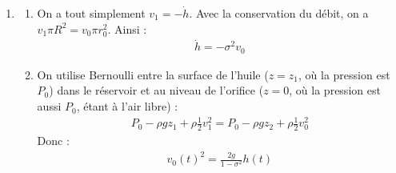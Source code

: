 \begin{correction}
\begin{enumerate}
\begin{enumerate}
	En utilisant l'expression de la divergence, on a:
	\begin{align*}
		\frac{1}{r}\frac{\partial(rv_r)}{\partial r}=-\frac{g}{\sqrt{v_0^2+2gz}}
	\end{align*}
	Ainsi, on peut proposer :
	\begin{align*}
		v_r(r,z)=-\frac{1}{2}\frac{gr}{\sqrt{v_0^2+2gz}}
	\end{align*}
	Cette expression est cohérente : la vitesse est bien dirigée vers l'axe $Oz$, et décroit en fonction de $z$, comme $v_z$. On peut vérifier plus en détail : pour une particule de fluide située en $z$ sur le bord du filet d'huile, en $r(z)$, parcourt pendant $dt$ une distance $\vec{dl}=dr\vec{e}_r+dz\vec{e}_z$, avec $dr=v_r\cdot dt$ et $dz=v_z\cdot dt$. On doit donc avoir : $v_r/v_z=dr/dz$.
Commençons par calculer $dr/dz$ :
	\begin{align*}
		\frac{dr}{dz}&=\frac{d}{dz}\left(\sqrt{\frac{r_0^2v_0}{\sqrt{v_0^2+2gz}}} \right) \\
		&=-\sqrt{r_0^2v_0}\frac{g}{2}(v_0^2+2gz)^{-5/4} \\
		&=-\frac{g}{2}\sqrt{\frac{r_0^2v_0}{\sqrt{v_0^2+2gz}}}\frac{1}{v_0^2+2gz}\\
		&=-\frac{g}{2}\frac{r}{v_0^2+2gz}
	\end{align*}
	
	Donc :
	\begin{align*}
		v_r&=v_z\frac{dr}{dz} \\
		&=-\frac{1}{2}\frac{gr}{\sqrt{v_0^2+2gz}}
	\end{align*}
	

\end{enumerate}

\item

\begin{enumerate}

	\item On a tout simplement $v_1=-\dot{h}$. Avec la conservation du débit, on a $v_1\pi R^2=v_0\pi r_0^2$. Ainsi :
	\begin{align*}
		\dot{h}=-\sigma^2 v_0
	\end{align*}

	\item On utilise Bernoulli entre la surface de l'huile ($z=z_1$, où la pression est $P_0$) dans le réservoir et au niveau de l'orifice ($z=0$, où la pression est aussi $P_0$, étant à l'air libre) :
	\begin{align*}
		P_0-\rho gz_1+\rho\frac{1}{2}v_1^2=P_0-\rho gz_2+\rho\frac{1}{2}v_0^2
	\end{align*}
	Donc :
	\begin{align*}
		v_0(t)^2=\frac{2g}{1-\sigma^2}h(t)
	\end{align*}
	

\end{enumerate}
\end{enumerate}
\end{correction}
